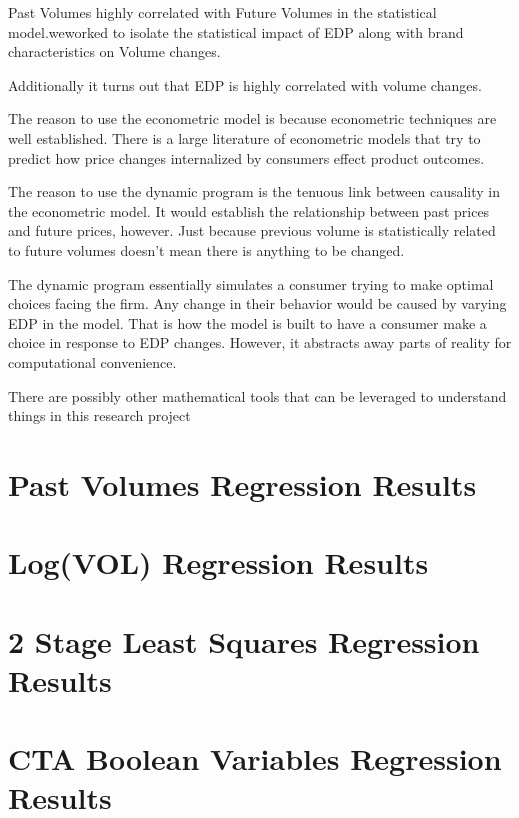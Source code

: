 \documentclass{article}
\begin{document}
Past Volumes highly correlated with Future Volumes in the statistical model.weworked to isolate the statistical impact of EDP along with brand characteristics on Volume changes.

Additionally it turns out that EDP is highly correlated with volume changes.

The reason to use the econometric model is because econometric techniques are well established. There is a large literature of econometric models that try to predict how price changes internalized by consumers effect product outcomes.

The reason to use the dynamic program is the tenuous link between causality in the econometric model. It would establish the relationship between past prices and future prices, however. Just because previous volume is statistically related to future volumes doesn't mean there is anything to be changed. 


The dynamic program essentially simulates a consumer trying to make optimal choices facing the firm. Any change in their behavior would be caused by varying EDP in the model. That is how the model is built to have a consumer make a choice in response to EDP changes. However, it abstracts away parts of reality for computational convenience.

There are possibly other mathematical tools that can be leveraged to understand things in this research project


\pagebreak

{}


\pagebreak

\begin{appendices}
\section{Past Volumes Regression Results}


\section{Log(VOL) Regression Results}


\section{2 Stage Least Squares Regression Results}


\section{CTA Boolean Variables Regression Results}



\end{appendices}
\end{document}

